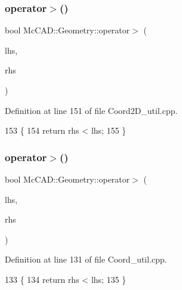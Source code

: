 \subsubsection{\texorpdfstring{operator$>$()}{operator>()}\hspace{0.1cm}{\footnotesize\ttfamily [1/3]}}
{\footnotesize\ttfamily bool Mc\+C\+A\+D\+::\+Geometry\+::operator$>$ (\begin{DoxyParamCaption}\item[{const \hyperlink{classMcCAD_1_1Geometry_1_1Coord2D}{Coord2D} \&}]{lhs,  }\item[{const \hyperlink{classMcCAD_1_1Geometry_1_1Coord2D}{Coord2D} \&}]{rhs }\end{DoxyParamCaption})}



Definition at line 151 of file Coord2\+D\+\_\+util.\+cpp.


\begin{DoxyCode}
153                            \{
154     \textcolor{keywordflow}{return} rhs < lhs;
155 \}
\end{DoxyCode}
\mbox{\label{namespaceMcCAD_1_1Geometry_ab21064b08087c86f76ba674ef7af932c}} 
\subsubsection{\texorpdfstring{operator$>$()}{operator>()}\hspace{0.1cm}{\footnotesize\ttfamily [2/3]}}
{\footnotesize\ttfamily bool Mc\+C\+A\+D\+::\+Geometry\+::operator$>$ (\begin{DoxyParamCaption}\item[{const \hyperlink{classMcCAD_1_1Geometry_1_1Coord}{Coord} \&}]{lhs,  }\item[{const \hyperlink{classMcCAD_1_1Geometry_1_1Coord}{Coord} \&}]{rhs }\end{DoxyParamCaption})}



Definition at line 131 of file Coord\+\_\+util.\+cpp.


\begin{DoxyCode}
133                          \{
134     \textcolor{keywordflow}{return} rhs < lhs;
135 \}
\end{DoxyCode}
\mbox{\label{namespaceMcCAD_1_1Geometry_a467cbcc1ae805c013105fbe50302ac10}} 
